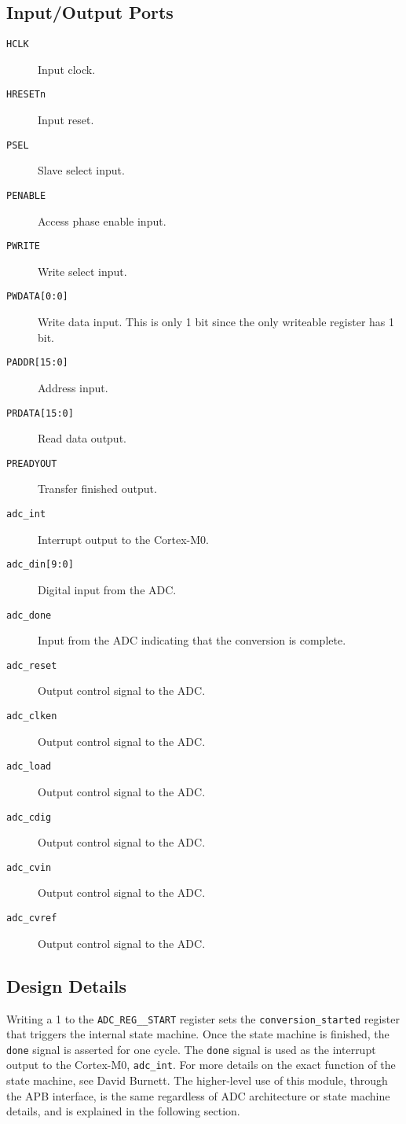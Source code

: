 \subsection{Input/Output Ports}
\begin{description}
	\item[\texttt{HCLK}] Input clock.
	\item[\texttt{HRESETn}] Input reset.
	\item[\texttt{PSEL}] Slave select input.
	\item[\texttt{PENABLE}] Access phase enable input.
	\item[\texttt{PWRITE}] Write select input.
	\item[\texttt{PWDATA[0:0]}] Write data input. This is only 1 bit since the only writeable register has 1 bit.
	\item[\texttt{PADDR[15:0]}] Address input.
	\item[\texttt{PRDATA[15:0]}] Read data output.
	\item[\texttt{PREADYOUT}] Transfer finished output.
	\item[\texttt{adc\_int}] Interrupt output to the Cortex-M0.
	\item[\texttt{adc\_din[9:0]}] Digital input from the ADC.
	\item[\texttt{adc\_done}] Input from the ADC indicating that the conversion is complete.
	\item[\texttt{adc\_reset}] Output control signal to the ADC.
	\item[\texttt{adc\_clken}] Output control signal to the ADC.
	\item[\texttt{adc\_load}] Output control signal to the ADC.
	\item[\texttt{adc\_cdig}] Output control signal to the ADC.
	\item[\texttt{adc\_cvin}] Output control signal to the ADC.
	\item[\texttt{adc\_cvref}] Output control signal to the ADC.
\end{description}

\subsection{Design Details}
Writing a 1 to the \texttt{ADC\_REG\_\_START} register sets the \texttt{conversion\_started} register that triggers the internal state machine. Once the state machine is finished, the \texttt{done} signal is asserted for one cycle. The \texttt{done} signal is used as the interrupt output to the Cortex-M0, \texttt{adc\_int}. For more details on the exact function of the state machine, see David Burnett. The higher-level use of this module, through the APB interface, is the same regardless of ADC architecture or state machine details, and is explained in the following section.

